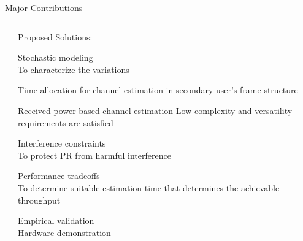 \documentclass[16pt]{beamer}
\newcommand{\fs}[2]{\fontsize{#1 pt}{#2}\selectfont}
\begin{document}
\begin{frame}[t]{Major Contributions}
\begin{columns}
		\begin{column}{0.03\columnwidth}
		\end{column}
		
		\begin{column}[t]{0.44\columnwidth}
			\centering Proposed Solutions: \\[-0.2em]
			\fs{7}{8}
			\begin{block}{}
				\centering
			  	Stochastic modeling \\ To characterize the variations 	
			\end{block}
			\vspace{-0.5mm}
			\begin{block}{}
				\centering
			   	Time allocation for channel estimation in secondary user's frame structure
			\end{block}
			\vspace{-0.5mm}
			\onslide<2->
			{
			\begin{block}{}
				\centering
				Received power based channel estimation
					Low-complexity and versatility requirements are satisfied  
			\end{block}
			}
			\vspace{-0.5mm}
			\onslide<3->
			{
			\begin{block}{}
				\centering
			  	Interference constraints  \\To protect PR from harmful interference 
			\end{block}
			}	
			\vspace{-0.5mm}
			\onslide<3->
			{
			\begin{block}{}
				\centering
			 	Performance tradeoffs \\ To determine suitable estimation time that determines the achievable throughput	
			\end{block}
			}
			\vspace{-0.4mm}
			\onslide<4->
			{
			\begin{block}{}%
				\centering
				Empirical validation \\ Hardware demonstration
			\end{block}
			}
		\end{column}
	\end{columns}
\end{frame}
\end{document}
